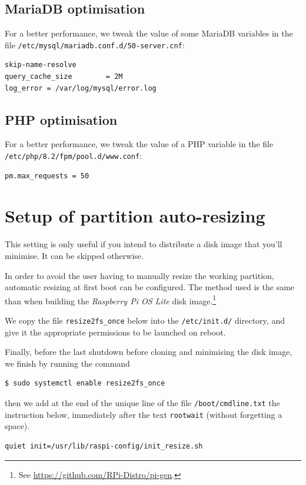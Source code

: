 \documentclass[12pt]{article}
\begin{document}
\subsection{MariaDB optimisation}\label{ssec-mariadb-optimisation}

For a better performance, we tweak the value of some MariaDB variables in the file \lstinline{/etc/mysql/mariadb.conf.d/50-server.cnf}:
\begin{lstlisting}[language=bash]
skip-name-resolve
query_cache_size        = 2M
log_error = /var/log/mysql/error.log
\end{lstlisting}

\subsection{PHP optimisation}\label{ssec-php-optimisation}

For a better performance, we tweak the value of a PHP variable in the file \lstinline{/etc/php/8.2/fpm/pool.d/www.conf}:
\begin{lstlisting}[language=bash]
pm.max_requests = 50
\end{lstlisting}

\section{Setup of partition auto-resizing}

This setting is only useful if you intend to distribute a disk image that you'll minimise.
It can be skipped otherwise.

In order to avoid the user having to manually resize the working partition, automatic resizing at first boot can be configured.
The method used is the same than when building the \emph{Raspberry Pi OS Lite} disk image.\footnote{See \url{https://github.com/RPi-Distro/pi-gen}.}

We copy the file \lstinline{resize2fs_once} below into the \lstinline{/etc/init.d/} directory, and give it the appropriate permissions to be launched on reboot.


Finally, before the last shutdown before cloning and minimising the disk image, we finish by running the command
\begin{lstlisting}[language=bash]
$ sudo systemctl enable resize2fs_once
\end{lstlisting}
then we add at the end of the unique line of the file \lstinline{/boot/cmdline.txt} the instruction below, immediately after the text \lstinline{rootwait} (without forgetting a space).
\begin{lstlisting}[language=bash]
quiet init=/usr/lib/raspi-config/init_resize.sh
\end{lstlisting}
\end{document}

